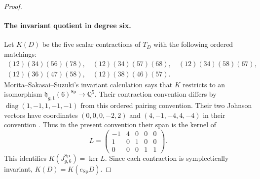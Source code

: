 \begin{proof}
\paragraph{The invariant quotient in degree six.}
Let $K(D)$ be the five scalar contractions of $T_D$
with the following ordered matchings:
\[
\begin{gathered}
(12)(34)(56)(78),\quad(12)(34)(57)(68),\quad
(12)(34)(58)(67),\\
(12)(36)(47)(58),\quad(12)(38)(46)(57).
\end{gathered}
\]
Morita--Sakasai--Suzuki's invariant calculation
\cite[Proposition~7.2, author pp.~26--27]{MSS2015}
says that $K$ restricts to an isomorphism
$\mathfrak h_{g,1}(6)^{\operatorname{Sp}}\to\mathbb Q^5$.
Their contraction convention differs by
$\operatorname{diag}(1,-1,1,-1,-1)$ from this ordered
pairing convention. Their two Johnson vectors have
coordinates $(0,0,0,-2,2)$ and $(4,-1,-4,4,-4)$
in their convention
\cite[proof of Theorem~7.5(i), author pp.~28--29]{MSS2015}.
Thus in the present convention their span is the kernel of
\[
 L=\begin{pmatrix}-1&4&0&0&0\\1&0&1&0&0\\0&0&0&1&1\end{pmatrix}.
\]
This identifies $K(J_{g,6}^{\operatorname{Sp}})=\ker L$.
Since each contraction is symplectically invariant,
$K(D)=K(e_{\operatorname{Sp}}D)$.


\end{proof}
